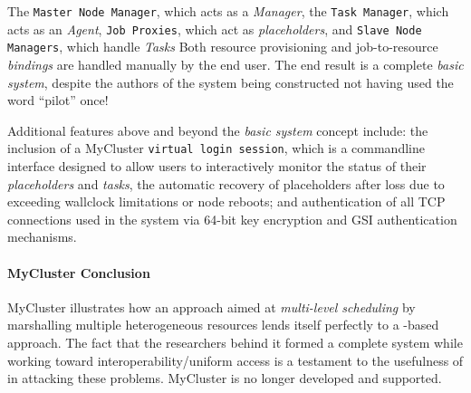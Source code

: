 \documentclass{sig-alternate}
\begin{document}
The \texttt{Master Node Manager}, which acts as a \textit{\pilotjob Manager},
the \texttt{Task Manager}, which acts as an \textit{\pilotjob Agent},
\texttt{Job Proxies}, which act as \textit{placeholders}, and \texttt{Slave
Node Managers}, which handle \textit{\pilotjob Tasks} Both resource
provisioning and job-to-resource \textit{bindings} are handled manually by the
end user.  The end result is a complete \textit{basic \pilotjob system},
despite the authors of the system being constructed not having used the word
``pilot'' once!~\cite{1652061}

Additional features above and beyond the \textit{basic \pilotjob system}
concept include: the inclusion of a MyCluster \texttt{virtual login session},
which is a commandline interface designed to allow users to interactively
monitor the status of their \textit{placeholders} and \textit{tasks}, the
automatic recovery of placeholders after loss due to exceeding wallclock
limitations or node reboots; and authentication of all TCP connections used in
the system via 64-bit key encryption and GSI authentication mechanisms.

\paragraph{MyCluster Conclusion}
MyCluster illustrates how an approach aimed at \textit{multi-level
scheduling} by marshalling multiple heterogeneous resources lends
itself perfectly to a \pilotjob-based approach.  The fact that
the researchers behind it formed a complete \pilotjob system
while working toward interoperability/uniform access is a testament
to the usefulness of \pilotjobs in attacking these problems.
MyCluster is no longer developed and supported.

\end{document}

